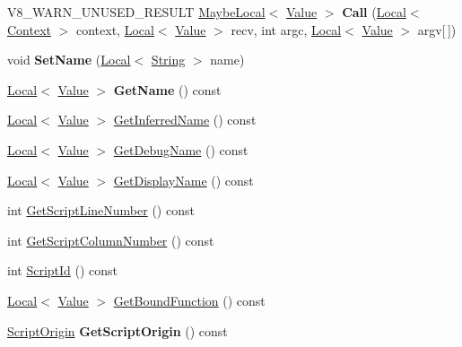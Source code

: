 \begin{DoxyCompactItemize}
\item 
\mbox{\label{classv8_1_1Function_a70c400602e70488f7c066b950219a1ad}} 
V8\+\_\+\+W\+A\+R\+N\+\_\+\+U\+N\+U\+S\+E\+D\+\_\+\+R\+E\+S\+U\+LT \mbox{\hyperlink{classv8_1_1MaybeLocal}{Maybe\+Local}}$<$ \mbox{\hyperlink{classv8_1_1Value}{Value}} $>$ {\bfseries Call} (\mbox{\hyperlink{classv8_1_1Local}{Local}}$<$ \mbox{\hyperlink{classv8_1_1Context}{Context}} $>$ context, \mbox{\hyperlink{classv8_1_1Local}{Local}}$<$ \mbox{\hyperlink{classv8_1_1Value}{Value}} $>$ recv, int argc, \mbox{\hyperlink{classv8_1_1Local}{Local}}$<$ \mbox{\hyperlink{classv8_1_1Value}{Value}} $>$ argv\mbox{[}$\,$\mbox{]})
\item 
\mbox{\label{classv8_1_1Function_aa9f51cea2036e0caa317e3955109856d}} 
void {\bfseries Set\+Name} (\mbox{\hyperlink{classv8_1_1Local}{Local}}$<$ \mbox{\hyperlink{classv8_1_1String}{String}} $>$ name)
\item 
\mbox{\label{classv8_1_1Function_a2428c830a713b5e54f91cab42f281b01}} 
\mbox{\hyperlink{classv8_1_1Local}{Local}}$<$ \mbox{\hyperlink{classv8_1_1Value}{Value}} $>$ {\bfseries Get\+Name} () const
\item 
\mbox{\hyperlink{classv8_1_1Local}{Local}}$<$ \mbox{\hyperlink{classv8_1_1Value}{Value}} $>$ \mbox{\hyperlink{classv8_1_1Function_aa8cc6843d3df84ff5faf41af41cb07bc}{Get\+Inferred\+Name}} () const
\item 
\mbox{\hyperlink{classv8_1_1Local}{Local}}$<$ \mbox{\hyperlink{classv8_1_1Value}{Value}} $>$ \mbox{\hyperlink{classv8_1_1Function_a36946ff78ea0448d992957fa164187f1}{Get\+Debug\+Name}} () const
\item 
\mbox{\hyperlink{classv8_1_1Local}{Local}}$<$ \mbox{\hyperlink{classv8_1_1Value}{Value}} $>$ \mbox{\hyperlink{classv8_1_1Function_aa889eb7452de7c7a695c5981f603c7cb}{Get\+Display\+Name}} () const
\item 
int \mbox{\hyperlink{classv8_1_1Function_a616f966e538ec32182acd4acb7ee70bc}{Get\+Script\+Line\+Number}} () const
\item 
int \mbox{\hyperlink{classv8_1_1Function_a87bc63f97a9a39f83051570519fc63c2}{Get\+Script\+Column\+Number}} () const
\item 
int \mbox{\hyperlink{classv8_1_1Function_a5070c2657325ed6ca05ebb932c641438}{Script\+Id}} () const
\item 
\mbox{\hyperlink{classv8_1_1Local}{Local}}$<$ \mbox{\hyperlink{classv8_1_1Value}{Value}} $>$ \mbox{\hyperlink{classv8_1_1Function_a33bea08b5ff0c605bde07897cf1c431e}{Get\+Bound\+Function}} () const
\item 
\mbox{\label{classv8_1_1Function_a79197c4c905cd1fb905f242c3d1d31cf}} 
\mbox{\hyperlink{classv8_1_1ScriptOrigin}{Script\+Origin}} {\bfseries Get\+Script\+Origin} () const
\end{DoxyCompactItemize}
